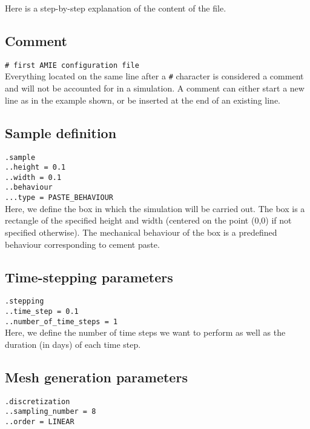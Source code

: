 \documentclass[10pt]{article}
\begin{document}
Here is a step-by-step explanation of the content of the file.

\subsection{Comment}

\verb+# first AMIE configuration file+\\

Everything located on the same line after a \verb+#+ character is considered a comment and will not be accounted for in a simulation. A comment can either start a new line as in the example shown, or be inserted at the end of an existing line.


\subsection{Sample definition}

\verb+.sample+\\
\verb+..height = 0.1+\\
\verb+..width = 0.1+\\
\verb+..behaviour+\\
\verb+...type = PASTE_BEHAVIOUR+\\

Here, we define the box in which the simulation will be carried out. The box is a rectangle of the specified height and width (centered on the point (0,0) if not specified otherwise). The mechanical behaviour of the box is a predefined behaviour corresponding to cement paste.

\subsection{Time-stepping parameters}

\verb+.stepping+\\
\verb+..time_step = 0.1+\\
\verb+..number_of_time_steps = 1+\\

Here, we define the number of time steps we want to perform as well as the duration (in days) of each time step.

\subsection{Mesh generation parameters}

\verb+.discretization+\\
\verb+..sampling_number = 8+\\
\verb+..order = LINEAR+\\
\end{document}
